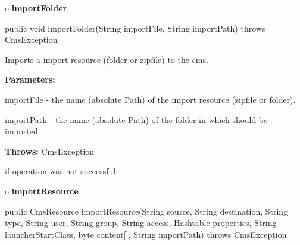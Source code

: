 o {\bf importFolder} 

\begin{PRE}
 public void importFolder(String importFile,
                          String importPath) throws CmsException
\end{PRE}

\begin{description}
\htmlDD Imports a import-resource (folder or zipfile) to the cms. 

\begin{description}
\item {\bf Parameters:}  

importFile - the name (absolute Path) of the import resource (zipfile or
folder).  

importPath - the name (absolute Path) of the folder in which should be
imported.  
\item {\bf Throws:} CmsException  

if operation was not successful.  
\end{description}

\end{description}

o {\bf importResource} 

\begin{PRE}
 public CmsResource importResource(String source,
                                   String destination,
                                   String type,
                                   String user,
                                   String group,
                                   String access,
                                   Hashtable properties,
                                   String launcherStartClass,
                                   byte content[],
                                   String importPath) throws CmsException
\end{PRE}

